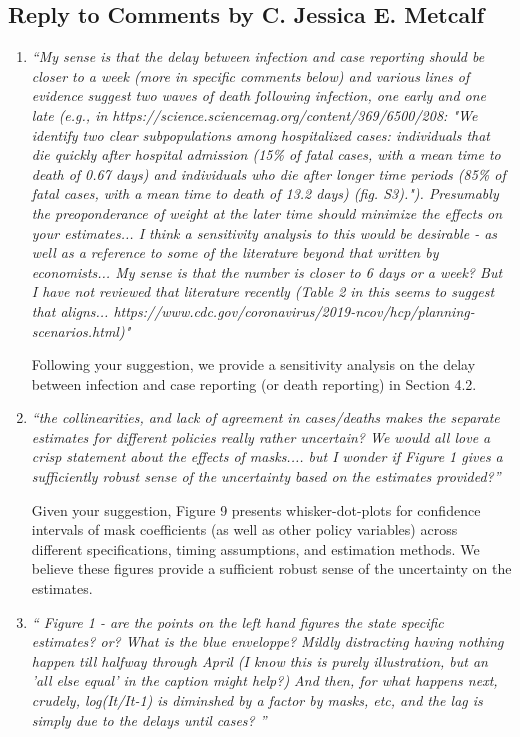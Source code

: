 \documentclass[11pt]{article}
\begin{document}
\subsection*{Reply to Comments  by C. Jessica E. Metcalf }
\begin{enumerate}

\item  \textit{``My sense is that the delay between infection and case reporting should be closer to a week (more in specific comments below) and various lines of evidence suggest two waves of death following infection, one early and one late (e.g., in https://science.sciencemag.org/content/369/6500/208: "We identify two clear subpopulations among hospitalized cases: individuals that die quickly after hospital admission (15\% of fatal cases, with a mean time to death of 0.67 days) and individuals who die after longer time periods (85\% of fatal cases, with a mean time to death of 13.2 days) (fig. S3)."). Presumably the preoponderance of weight at the later time should minimize the effects on your estimates... I think a sensitivity analysis to this would be desirable - as well as a reference to some of the literature beyond that written by economists... My sense is that the number is closer to 6 days or a week? But I have not reviewed that literature recently (Table 2 in this seems to suggest that aligns... https://www.cdc.gov/coronavirus/2019-ncov/hcp/planning-scenarios.html)"}

Following your suggestion,   we provide a sensitivity analysis on the delay between infection and case reporting (or death reporting) in Section 4.2. 

\item \textit{``the collinearities, and lack of agreement in cases/deaths makes the separate estimates for different policies really rather uncertain? We would all love a crisp statement about the effects of masks.... but I wonder if Figure 1 gives a sufficiently robust sense of the uncertainty  based on the estimates provided?''}
 
Given  your suggestion, Figure 9 presents whisker-dot-plots for confidence intervals of mask coefficients (as well as other policy variables) across different specifications, timing assumptions, and estimation methods. We believe these figures provide a sufficient robust sense of the uncertainty on the  estimates. 
  
\item \textit{`` Figure 1 - are the points on the left hand figures the state specific estimates? or? What is the blue enveloppe? Mildly distracting having nothing happen till halfway through April (I know this is purely illustration, but an 'all else equal' in the caption might help?) And then, for what happens next, crudely, log(It/It-1) is diminshed by a factor by masks, etc, and the lag is simply due to the delays until cases? ''}
 

\end{enumerate}
\end{document}
